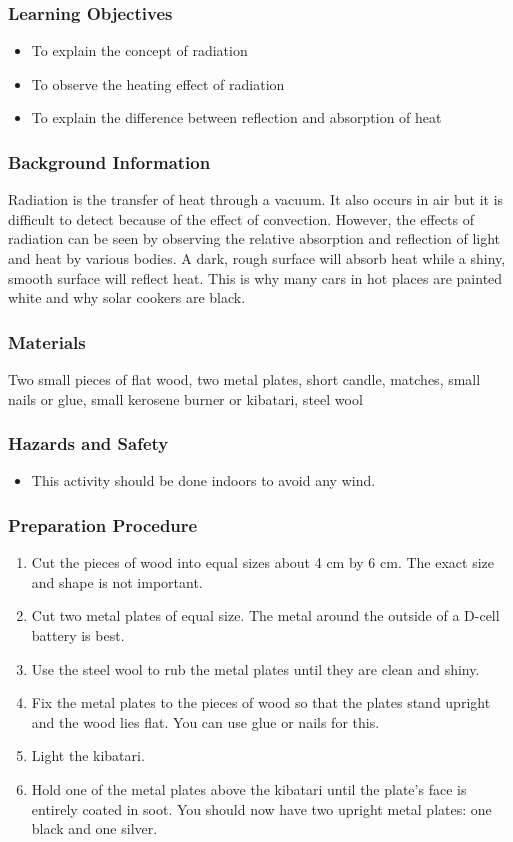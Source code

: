 \subsubsection*{Learning Objectives}
\begin{itemize}
\item{To explain the concept of radiation}
\item{To observe the heating effect of radiation}
\item{To explain the difference between reflection and absorption of heat}
\end{itemize}

\subsubsection*{Background Information}
Radiation is the transfer of heat through a vacuum.  It also occurs in air but it is difficult to detect because of the effect of convection.
However, the effects of radiation can be seen by observing the relative absorption and reflection of light and heat by various bodies.  A dark, rough surface will absorb heat while a shiny, smooth surface will reflect heat.  This is why many cars in hot places are painted white and why solar cookers are black.

\subsubsection*{Materials}
Two small pieces of flat wood, two metal plates, short candle, matches, small nails or glue, small kerosene burner or kibatari, steel wool

\subsubsection*{Hazards and Safety}
\begin{itemize}
\item{This activity should be done indoors to avoid any wind.}
\end{itemize}

\subsubsection*{Preparation Procedure}
\begin{enumerate}
\item{Cut the pieces of wood into equal sizes about 4 cm by 6 cm.  The exact size and shape is not important.}
\item{Cut two metal plates of equal size.  The metal around the outside of a D-cell battery is best.}
\item{Use the steel wool to rub the metal plates until they are clean and shiny.}
\item{Fix the metal plates to the pieces of wood so that the plates stand upright and the wood lies flat.  You can use glue or nails for this.}
\item{Light the kibatari.}
\item{Hold one of the metal plates above the kibatari until the plate's face is entirely coated in soot.  You should now have two upright metal plates: one black and one silver.}
\end{enumerate}

